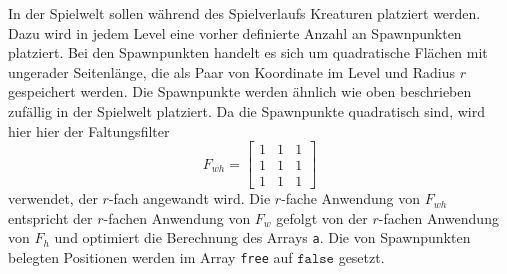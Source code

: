 In der Spielwelt sollen während des Spielverlaufs Kreaturen platziert werden. Dazu wird in jedem Level eine vorher definierte Anzahl an Spawnpunkten platziert. Bei den Spawnpunkten handelt es sich um quadratische Flächen mit ungerader Seitenlänge, die als Paar von Koordinate im Level und Radius $r$ gespeichert werden. Die Spawnpunkte werden ähnlich wie oben beschrieben zufällig in der Spielwelt platziert. Da die Spawnpunkte quadratisch sind, wird hier hier der Faltungsfilter \begin{displaymath}
    F_{wh}=\begin{bmatrix}
        1&1&1\\
        1&1&1\\
        1&1&1
    \end{bmatrix}
\end{displaymath} verwendet, der $r$-fach angewandt wird. Die $r$-fache Anwendung von $F_{wh}$ entspricht der $r$-fachen Anwendung von $F_w$ gefolgt von der $r$-fachen Anwendung von $F_h$ und optimiert die Berechnung des Arrays \texttt{a}. Die von Spawnpunkten belegten Positionen werden im Array \texttt{free} auf $\texttt{false}$ gesetzt.
 
